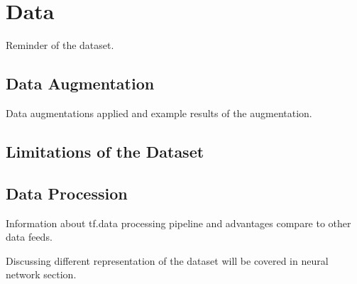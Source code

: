 \chapter{Data} \label{chap:data}
Reminder of the dataset.~\cite{openi} 

\section{Data Augmentation}
Data augmentations applied and example results of the augmentation.

\section{Limitations of the Dataset}

\section{Data Procession}
Information about tf.data processing pipeline and advantages compare to other data feeds.

Discussing different representation of the dataset will be covered in neural network section.
\clearpage